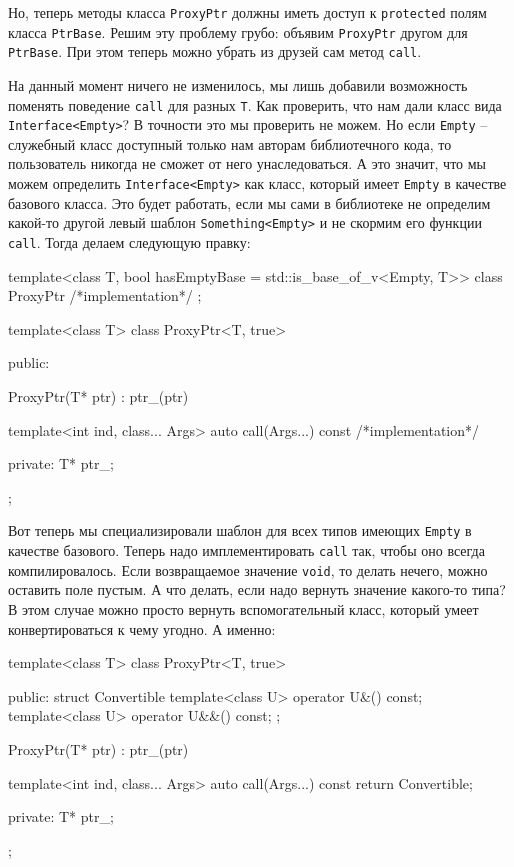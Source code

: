 Но, теперь методы класса \verb"ProxyPtr" должны иметь доступ к \verb"protected" полям класса \verb"PtrBase".
Решим эту проблему грубо: объявим \verb"ProxyPtr" другом для \verb"PtrBase".
При этом теперь можно убрать из друзей сам метод \verb"call".
\begin{cppcode}
template<class Data>
class PtrBase {
protected:
  ...
  template<class T, bool>
  friend class ProxyPtr;
  ...
  public:
  ...
\end{cppcode}
На данный момент ничего не изменилось, мы лишь добавили возможность поменять поведение \verb"call" для разных \verb"T".
Как проверить, что нам дали класс вида \verb"Interface<Empty>"?
В точности это мы проверить не можем.
Но если \verb"Empty" -- служебный класс доступный только нам авторам библиотечного кода, то пользователь никогда не сможет от него унаследоваться.
А это значит, что мы можем определить \verb"Interface<Empty>" как класс, который имеет \verb"Empty" в качестве базового класса.
Это будет работать, если мы сами в библиотеке не определим какой-то другой левый шаблон \verb"Something<Empty>" и не скормим его функции \verb"call".
Тогда делаем следующую правку:
\begin{cppcode}
template<class T, bool hasEmptyBase = std::is_base_of_v<Empty, T>>
class ProxyPtr {
  /*implementation*/
  };
  
template<class T>
class ProxyPtr<T, true> {
public:

  ProxyPtr(T* ptr) : ptr_(ptr) {
  }
  
  template<int ind, class... Args>
  auto call(Args...) const {
    /*implementation*/
  }

private:
  T* ptr_;
};  
\end{cppcode}
Вот теперь мы специализировали шаблон для всех типов имеющих \verb"Empty" в качестве базового.
Теперь надо имплементировать \verb"call" так, чтобы оно всегда компилировалось.
Если возвращаемое значение \verb"void", то делать нечего, можно оставить поле пустым.
А что делать, если надо вернуть значение какого-то типа?
В этом случае можно просто вернуть вспомогательный класс, который умеет конвертироваться к чему угодно.
А именно:
\begin{cppcode}
template<class T>
class ProxyPtr<T, true> {
public:
  struct Convertible {
    template<class U>
    operator U&() const;
    template<class U>
    operator U&&() const;
  };

  ProxyPtr(T* ptr) : ptr_(ptr) {
  }
  
  template<int ind, class... Args>
  auto call(Args...) const {
    return Convertible{};
  }

private:
  T* ptr_;
};
\end{cppcode}
